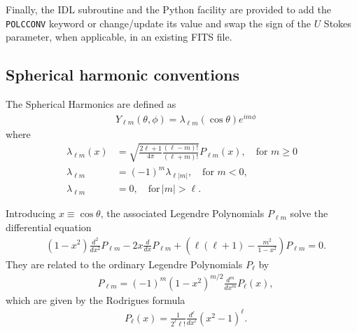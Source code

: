 \documentclass[12pt,twoside]{article}
\newcommand{\myhtmlimage}[1]{ }
\begin{document}
Finally, 
the IDL subroutine 
and the Python facility 
 are 
provided to add the  \texttt{POLCCONV} keyword or
change/update its value and swap the sign of the $U$ Stokes parameter, when applicable, in
an existing FITS file.

%
\subsection{Spherical harmonic conventions}
\label{sphericalstuff}

The Spherical Harmonics are defined as
\begin{align}
	& Y_{\ell m}(\theta,\phi) = \lambda_{\ell m}(\cos\theta) e^{{i}
	m\phi} \label{eq:ylm_def} \myhtmlimage{}
\end{align}
where 
\begin{align}
	\lambda_{\ell m}(x) &= \sqrt{ \frac{2\ell+1}{4\pi}
	\frac{(\ell-m)!}{(\ell+m)!} } P_{\ell m}(x), \quad\textrm{for~}
	m\ge 0 	\label{eq:lam_def} \\
%
	\lambda_{\ell m} &= (-1)^m \lambda_{\ell |m|}, \quad\textrm{for~}
	m <  0, \nonumber \\
%
	\lambda_{\ell m} &= 0, \quad\textrm{for}\, |m| > \ell.\nonumber
	\myhtmlimage{}
\end{align}

Introducing $x\equiv\cos\theta$, the associated Legendre Polynomials $P_{\ell m}$ 
solve the differential equation
\begin{align}
	& (1-x^2)\frac{d^2}{dx^2}P_{\ell m} - 2x \frac{d}{dx}P_{\ell m}
	+ \left(\ell(\ell+1) - \frac{m^2}{1-x^2}\right) P_{\ell m} = 0.
	\myhtmlimage{}
\label{eq:diff_eq}
\end{align}
They are related to the ordinary Legendre Polynomials $P_\ell$ by
\begin{align}
	& P_{\ell m} = (-1)^m (1-x^2)^{m/2} \frac{d^m}{dx^m} P_{\ell}(x),
	\myhtmlimage{}
\label{eq:legendreass}
\end{align}
which are given by the Rodrigues formula
\begin{align}
	& P_{\ell}(x) = \frac{1}{2^\ell \ell!}\frac{d^\ell}{dx^\ell} (x^2-1)^\ell.
	\myhtmlimage{}
\label{eq:rodrigues}
\end{align}
\end{document}
